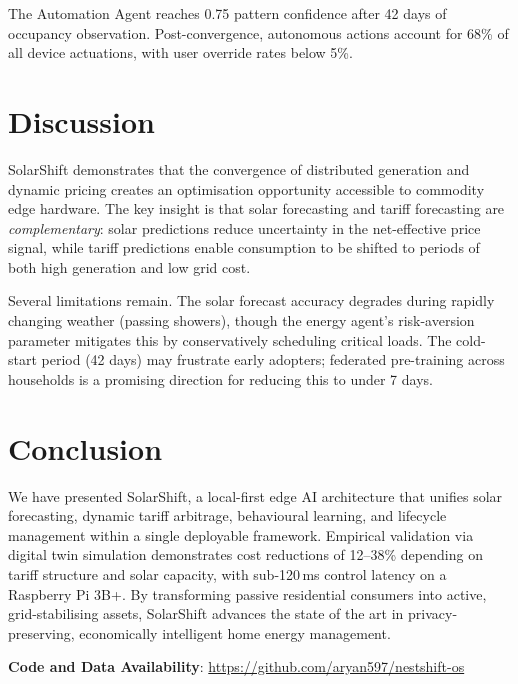 \documentclass[11pt,a4paper]{article}
\begin{document}
The Automation Agent reaches 0.75 pattern confidence after 42 days of occupancy observation. Post-convergence, autonomous actions account for 68\% of all device actuations, with user override rates below 5\%.

\section{Discussion}

SolarShift demonstrates that the convergence of distributed generation and dynamic pricing creates an optimisation opportunity accessible to commodity edge hardware. The key insight is that solar forecasting and tariff forecasting are \textit{complementary}: solar predictions reduce uncertainty in the net-effective price signal, while tariff predictions enable consumption to be shifted to periods of both high generation and low grid cost.

Several limitations remain. The solar forecast accuracy degrades during rapidly changing weather (passing showers), though the energy agent's risk-aversion parameter mitigates this by conservatively scheduling critical loads. The cold-start period (42 days) may frustrate early adopters; federated pre-training across households is a promising direction for reducing this to under 7 days.

\section{Conclusion}

We have presented SolarShift, a local-first edge AI architecture that unifies solar forecasting, dynamic tariff arbitrage, behavioural learning, and lifecycle management within a single deployable framework. Empirical validation via digital twin simulation demonstrates cost reductions of 12--38\% depending on tariff structure and solar capacity, with sub-120\,ms control latency on a Raspberry Pi 3B+. By transforming passive residential consumers into active, grid-stabilising assets, SolarShift advances the state of the art in privacy-preserving, economically intelligent home energy management.

\vspace{1em}
\noindent\textbf{Code and Data Availability}: \url{https://github.com/aryan597/nestshift-os}
\end{document}
